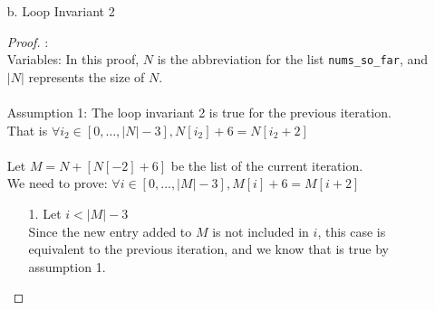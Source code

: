 \documentclass[fontsize=11pt]{article}
\begin{document}
\begin{enumerate}
\begin{enumerate}
\begin{proof}
\begin{enumerate}
    \item[1.] Proving for $gcd(N[-2] + 6, 2) = 1$ \\
        Pick $a = N[-2], k = 3, n = 2$ \\
        Since we know $gcd(N[-2], 2) = 1$, $gcd(a, n) = 1$ is true. \\
        Therefore, by assumption 2, we know that $gcd(a + kn, n) = 1$ is also true. \\
        Substituting the varaibles back, we know $gcd(N[-2] + 6, 2) = 1$.
    \item[2.] Proving for $gcd(N[-2] + 6, 3) = 1$ \\
        Pick $a = N[-2], k = 2, n = 3$ \\
        Since we know $gcd(N[-2], 3) = 1$, $gcd(a, n) = 1$ is true. \\
        Therefore, by assumption 2, we know that $gcd(a + kn, n) = 1$ is also true. \\
        Substituting the varaibles back, we know $gcd(N[-2] + 6, 3) = 1$.
\end{enumerate}
\end{proof}

\item[b.] Loop Invariant 2
\begin{proof} : \\
Variables: In this proof, $N$ is the abbreviation for the list \texttt{nums\_so\_far}, and $|N|$ represents the size of $N$. \\
\\
Assumption 1: The loop invariant 2 is true for the previous iteration. \\
That is $\forall i_2 \in [0, \dots, |N| - 3], N[i_2] + 6 = N[i_2 + 2]$ \\
\\
Let $M = N + [N[-2] + 6]$ be the list of the current iteration. \\
We need to prove: $\forall i \in [0, \dots, |M| - 3], M[i] + 6 = M[i + 2] $

\begin{enumerate}
    \item[1.] Let $i < |M| - 3$ \\
        Since the new entry added to $M$ is not included in $i$, this case is equivalent to the previous iteration, and we know that is true by assumption 1.


\end{enumerate}
\end{proof}
\end{enumerate}
\end{enumerate}
\end{document}
